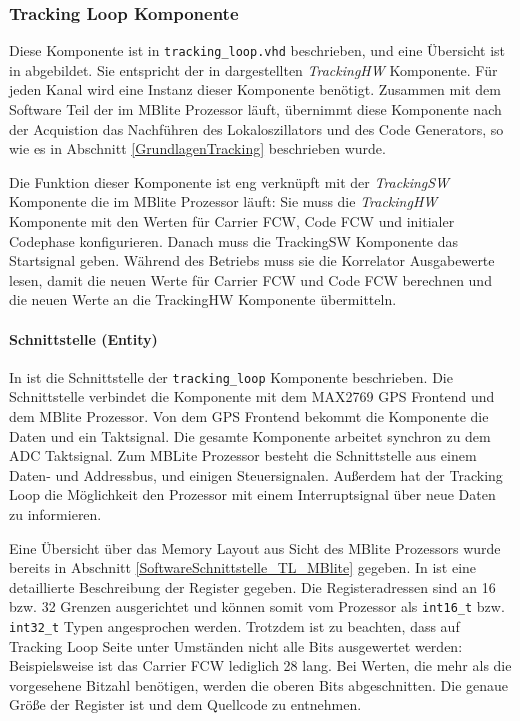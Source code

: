 \subsubsection{Tracking  Loop Komponente}
Diese Komponente ist in \lstinline$tracking_loop.vhd$ beschrieben, und eine Übersicht ist in  abgebildet. Sie entspricht der in  dargestellten \emph{TrackingHW} Komponente. Für jeden Kanal wird eine Instanz dieser Komponente benötigt. Zusammen mit dem Software Teil der im MBlite Prozessor läuft, übernimmt diese Komponente nach der Acquistion das Nachführen des Lokaloszillators und des Code Generators, so wie es in Abschnitt \ref{GrundlagenTracking} beschrieben wurde.

Die Funktion dieser Komponente ist eng verknüpft mit der \emph{TrackingSW} Komponente die im MBlite Prozessor läuft: Sie muss die \emph{TrackingHW} Komponente mit den Werten für Carrier FCW, Code FCW und initialer Codephase konfigurieren. Danach muss die TrackingSW Komponente das Startsignal geben. Während des Betriebs muss sie die Korrelator Ausgabewerte lesen, damit die neuen Werte für Carrier FCW und Code FCW berechnen und die neuen Werte an die TrackingHW Komponente übermitteln.


\paragraph{Schnittstelle (Entity)}
\label{ImplMemoryMapTrackingloop}
In  ist die Schnittstelle der \lstinline$tracking_loop$ Komponente beschrieben. Die Schnittstelle verbindet die Komponente mit dem MAX2769 GPS Frontend und dem MBlite Prozessor. Von dem GPS Frontend bekommt die Komponente die Daten und ein Taktsignal. Die gesamte Komponente arbeitet synchron zu dem ADC Taktsignal. Zum MBLite Prozessor besteht die Schnittstelle aus einem Daten- und Addressbus, und einigen Steuersignalen. Außerdem hat der Tracking Loop die Möglichkeit den Prozessor mit einem Interruptsignal über neue Daten zu informieren.

Eine Übersicht über das Memory Layout aus Sicht des MBlite Prozessors wurde bereits in Abschnitt \ref{SoftwareSchnittstelle_TL_MBlite} gegeben. In   ist eine detaillierte Beschreibung der Register gegeben. Die Registeradressen sind an \num{16} bzw. \SI{32}{\bit} Grenzen ausgerichtet und können somit vom Prozessor als \lstinline$int16_t$ bzw. \lstinline$int32_t$ Typen angesprochen werden. Trotzdem ist zu beachten, dass auf Tracking Loop Seite unter Umständen nicht alle Bits ausgewertet werden: Beispielsweise ist das Carrier FCW lediglich \SI{28}{\bit} lang. Bei Werten, die mehr als die vorgesehene Bitzahl benötigen, werden die oberen Bits abgeschnitten. Die genaue Größe der Register ist  und dem Quellcode zu entnehmen.

